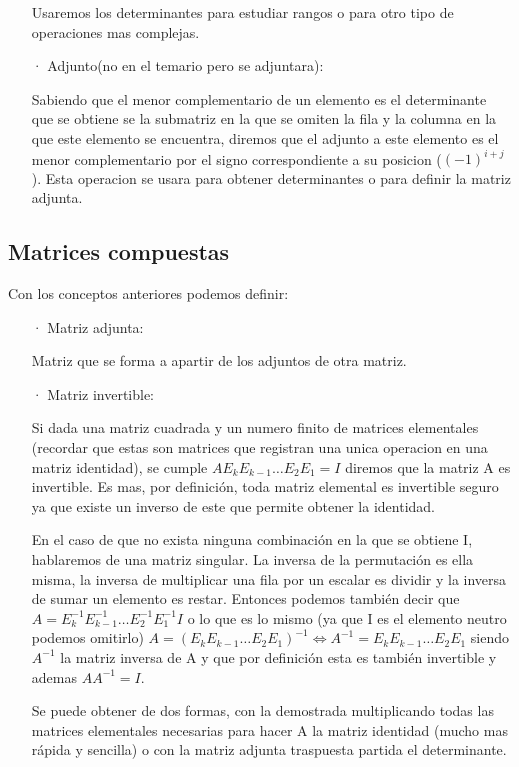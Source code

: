 \documentclass[11pt,a4paper]{article}
\begin{document}
\begin{enumerate}
 Usaremos los determinantes para estudiar rangos o para otro tipo de operaciones mas complejas.

 \item[·]Adjunto(no en el temario pero se adjuntara): 
 
 Sabiendo que el menor complementario de un elemento es el determinante que se obtiene se la submatriz en la que se omiten la fila y la columna en la que este elemento se encuentra, diremos que el adjunto a este elemento es el menor complementario por el signo correspondiente a su posicion ($(-1)^{i+j}$). Esta operacion se usara para obtener determinantes o para definir la matriz adjunta. 
 
\end{enumerate}


\subsection{Matrices compuestas}

Con los conceptos anteriores podemos definir:

\begin{enumerate}
\item[·] Matriz adjunta:

Matriz que se forma a apartir de los adjuntos de otra matriz.

\item[·] Matriz invertible:

Si dada una matriz cuadrada y un numero finito de matrices elementales (recordar que estas son matrices que registran una unica operacion en una matriz identidad), se cumple $AE_kE_{k-1}\dots E_2E_1=I$ diremos que la matriz A es invertible. Es mas, por definición, toda matriz elemental es invertible seguro ya que existe un inverso de este que permite obtener la identidad. 

En el caso de que no exista ninguna combinación en la que se obtiene I, hablaremos de una matriz singular. La inversa de la permutación es ella misma, la inversa de multiplicar una fila por un escalar es dividir y la inversa de sumar un elemento es restar. Entonces podemos también decir que $A=E_k^{-1}E_{k-1}^{-1}\dots E_2^{-1}E_1^{-1}I$
o lo que es lo mismo (ya que I es el elemento neutro podemos omitirlo) $A=(E_kE_{k-1}\dots E_2E_1)^{-1}\Leftrightarrow A^{-1}=E_kE_{k-1}\dots E_2E_1$ siendo $A^{-1}$ la matriz inversa de A y que por definición esta es también invertible y ademas $AA^{-1}=I$.

Se puede obtener de dos formas, con la demostrada multiplicando todas las matrices elementales necesarias para hacer A la matriz identidad (mucho mas rápida y sencilla) o con la matriz adjunta traspuesta partida el determinante.
\end{enumerate}
\end{document}

